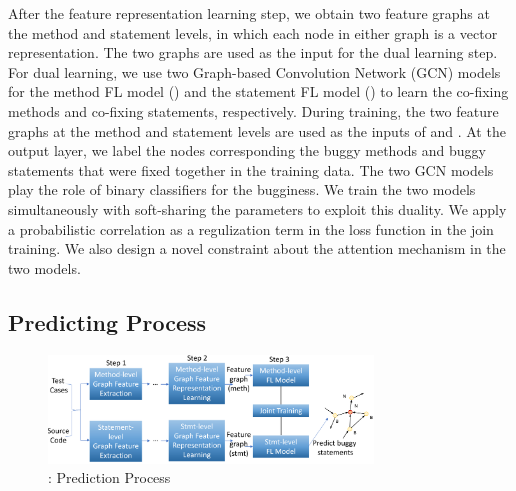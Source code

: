\vspace{3pt}
After the feature representation learning step, we obtain two feature
graphs at the method and statement levels, in which each node in
either graph is a vector representation. The two graphs are used as
the input for the dual learning step. For dual learning, we use two
Graph-based Convolution Network (GCN) models~\cite{kipf2016semi} for
the method FL model () and the statement FL model
() to learn the co-fixing methods and co-fixing
statements, respectively. During training, the two feature graphs at
the method and statement levels are used as the inputs of
 and . At the output layer, we label the
nodes corresponding the buggy methods and buggy statements that were
fixed together in the training data. The two GCN models play the role
of binary classifiers for the bugginess.
%
We train the two models simultaneously with soft-sharing the
parameters to exploit this duality. We apply a probabilistic
correlation as a regulization term in the loss function in the join
training. We also design a novel constraint about the attention
mechanism in the two models.



\subsection{Predicting Process}

\begin{figure}[t]
	\centering
	\includegraphics[width=3.4in]{graphs/overview-predict.png}
	\caption{{\tool}: Prediction Process}
	\label{predict-overview}
\end{figure}

